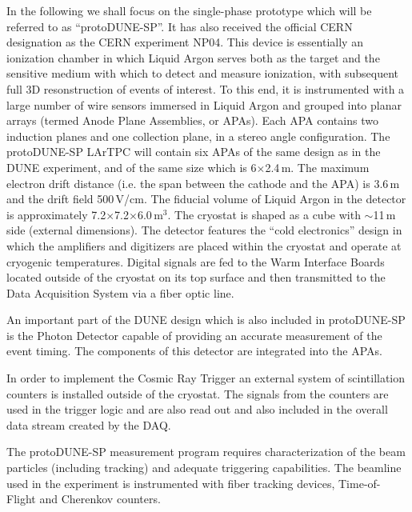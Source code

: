 \documentclass{PoS}
\newcommand{\pd}{protoDUNE\xspace}
\begin{document}
In the following we shall focus on the single-phase prototype which will be referred to as ``protoDUNE-SP''.
It has also received the official CERN designation as the CERN experiment NP04.
This device is essentially an ionization chamber in which Liquid Argon serves both as the target and
the sensitive medium with which to detect and measure ionization, with subsequent full 3D resonstruction of
events of interest. To this end, it is instrumented with a large number
of wire sensors immersed in Liquid Argon and grouped into planar arrays (termed Anode Plane Assemblies, or APAs). Each APA contains
two induction planes and one collection plane, in a stereo angle configuration.
The \pd-SP LArTPC will contain six APAs of the same design as in the DUNE
experiment, and of the same size which is 6$\times$2.4\,m. The maximum electron drift distance (i.e. the span between
the cathode and the APA) is 3.6\,m
and the drift field 500\,V/cm. The fiducial volume of Liquid Argon in the detector
is approximately 7.2$\times$7.2$\times$6.0\,m$^3$. The cryostat is shaped as a cube
with $\sim$11\,m side (external dimensions).
The detector features the ``cold electronics'' design
in which the amplifiers and digitizers are placed within the cryostat and operate at
cryogenic temperatures. Digital signals are fed to the Warm Interface Boards located
outside of the cryostat on its top surface and then transmitted to the Data Acquisition
System via a fiber optic line.

An important part of the DUNE design which is also included in \pd-SP is the Photon Detector capable
of providing an accurate measurement of the event timing. The components of this detector are integrated
into the APAs.

In order to implement the Cosmic Ray Trigger an external system of scintillation counters is installed
outside of the cryostat. The signals from the counters are used in the trigger logic and are also
read out and also included in the overall data stream created by the DAQ.

The \pd-SP measurement program requires characterization of the beam particles (including tracking) and adequate triggering
capabilities. The beamline used in the experiment is instrumented with fiber tracking devices, Time-of-Flight and
Cherenkov counters.



\end{document}
